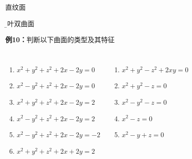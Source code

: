 \begin{frame}{直纹面}
	\linespread{1.2}
	\pause 
	\begin{center}
		
		{\b 单叶双曲面}
 	\end{center}
\end{frame}

\begin{frame}[<+->]
	\linespread{1.2}
	\begin{exampleblock}{{\bf 例10：}判断以下曲面的类型及其特征\hfill}
		\begin{columns}[t]
				\begin{enumerate}
				  \item $x^2+y^2+z^2+2x-2y=0$
				  \item $x^2-y^2+z^2+2x-2y=0$
				  \item $x^2+y^2+z^2+2x-2y=2$
				  \item $x^2-y^2+z^2+2x-2y=2$
				  \item $x^2-y^2+z^2+2x-2y=-2$
				  \item $x^2+y^2+z^2+2x+2y=2$
				\end{enumerate}
				\begin{enumerate}
				  \addtocounter{enumi}{6}
				  \item $x^2+y^2-z^2+2xy=0$
				  \item $x^2+y^2-z=0$
				  \item $x^2-y^2-z=0$
				  \item $x^2-z=0$
				  \item $x^2-y+z=0$
				\end{enumerate}
		\end{columns}
	\end{exampleblock}
\end{frame}

